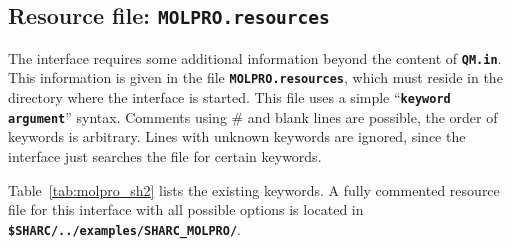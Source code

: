 \documentclass[a4paper,10pt,DIV=15,openany]{scrbook}
\newcommand{\ttt}[1]{\textbf{\texttt{#1}}}
\begin{document}
\subsection{Resource file: \ttt{MOLPRO.resources}}

The interface requires some additional information beyond the content of \ttt{QM.in}. This information is given in the file \ttt{MOLPRO.resources}, which must reside in the directory where the interface is started. This file uses a simple ``\ttt{keyword argument}'' syntax. Comments using \# and blank lines are possible, the order of keywords is arbitrary. Lines with unknown keywords are ignored, since the interface just searches the file for certain keywords.

Table~\ref{tab:molpro_sh2} lists the existing keywords.
A fully commented resource file for this interface with all possible options is located in \ttt{\$SHARC/../examples/SHARC\_MOLPRO/}.
\end{document}
